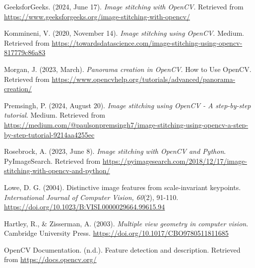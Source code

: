 \documentclass[12pt, letterpaper, ]{article}
\begin{document}
\begin{thebibliography}{}

GeeksforGeeks. (2024, June 17). \textit{Image stitching with OpenCV}. Retrieved from \url{https://www.geeksforgeeks.org/image-stitching-with-opencv/}

Kommineni, V. (2020, November 14). \textit{Image stitching using OpenCV}. Medium. Retrieved from \url{https://towardsdatascience.com/image-stitching-using-opencv-817779c86a83}

Morgan, J. (2023, March). \textit{Panorama creation in OpenCV}. How to Use OpenCV. Retrieved from \url{https://www.opencvhelp.org/tutorials/advanced/panorama-creation/}

Premsingh, P. (2024, August 20). \textit{Image stitching using OpenCV - A step-by-step tutorial}. Medium. Retrieved from \url{https://medium.com/@paulsonpremsingh7/image-stitching-using-opencv-a-step-by-step-tutorial-9214aa4255ec}

Rosebrock, A. (2023, June 8). \textit{Image stitching with OpenCV and Python}. PyImageSearch. Retrieved from \url{https://pyimagesearch.com/2018/12/17/image-stitching-with-opencv-and-python/}

Lowe, D. G. (2004). Distinctive image features from scale-invariant keypoints. \textit{International Journal of Computer Vision, 60}(2), 91-110. \url{https://doi.org/10.1023/B:VISI.0000029664.99615.94}

Hartley, R., \& Zisserman, A. (2003). \textit{Multiple view geometry in computer vision}. Cambridge University Press. \url{https://doi.org/10.1017/CBO9780511811685}

OpenCV Documentation. (n.d.). Feature detection and description. Retrieved from \url{https://docs.opencv.org/}

\end{thebibliography}
\end{document}
